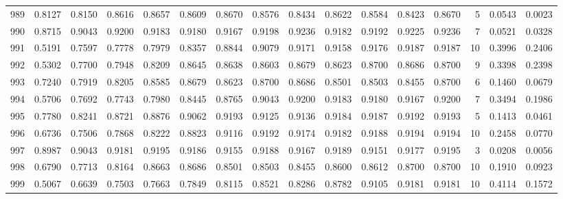 \begin{tabular}{lrrrrrrrrrrrrrrr}
989 &      0.8127 &  0.8150 &  0.8616 &  0.8657 &  0.8609 &  0.8670 &  0.8576 &  0.8434 &  0.8622 &  0.8584 &   0.8423 &     0.8670 &      5 &                    0.0543 &                     0.0023 \\
990 &      0.8715 &  0.9043 &  0.9200 &  0.9183 &  0.9180 &  0.9167 &  0.9198 &  0.9236 &  0.9182 &  0.9192 &   0.9225 &     0.9236 &      7 &                    0.0521 &                     0.0328 \\
991 &      0.5191 &  0.7597 &  0.7778 &  0.7979 &  0.8357 &  0.8844 &  0.9079 &  0.9171 &  0.9158 &  0.9176 &   0.9187 &     0.9187 &     10 &                    0.3996 &                     0.2406 \\
992 &      0.5302 &  0.7700 &  0.7948 &  0.8209 &  0.8645 &  0.8638 &  0.8603 &  0.8679 &  0.8623 &  0.8700 &   0.8686 &     0.8700 &      9 &                    0.3398 &                     0.2398 \\
993 &      0.7240 &  0.7919 &  0.8205 &  0.8585 &  0.8679 &  0.8623 &  0.8700 &  0.8686 &  0.8501 &  0.8503 &   0.8455 &     0.8700 &      6 &                    0.1460 &                     0.0679 \\
994 &      0.5706 &  0.7692 &  0.7743 &  0.7980 &  0.8445 &  0.8765 &  0.9043 &  0.9200 &  0.9183 &  0.9180 &   0.9167 &     0.9200 &      7 &                    0.3494 &                     0.1986 \\
995 &      0.7780 &  0.8241 &  0.8721 &  0.8876 &  0.9062 &  0.9193 &  0.9125 &  0.9136 &  0.9184 &  0.9187 &   0.9192 &     0.9193 &      5 &                    0.1413 &                     0.0461 \\
996 &      0.6736 &  0.7506 &  0.7868 &  0.8222 &  0.8823 &  0.9116 &  0.9192 &  0.9174 &  0.9182 &  0.9188 &   0.9194 &     0.9194 &     10 &                    0.2458 &                     0.0770 \\
997 &      0.8987 &  0.9043 &  0.9181 &  0.9195 &  0.9186 &  0.9155 &  0.9188 &  0.9167 &  0.9189 &  0.9151 &   0.9177 &     0.9195 &      3 &                    0.0208 &                     0.0056 \\
998 &      0.6790 &  0.7713 &  0.8164 &  0.8663 &  0.8686 &  0.8501 &  0.8503 &  0.8455 &  0.8600 &  0.8612 &   0.8700 &     0.8700 &     10 &                    0.1910 &                     0.0923 \\
999 &      0.5067 &  0.6639 &  0.7503 &  0.7663 &  0.7849 &  0.8115 &  0.8521 &  0.8286 &  0.8782 &  0.9105 &   0.9181 &     0.9181 &     10 &                    0.4114 &                     0.1572 \\
\bottomrule
\end{tabular}

